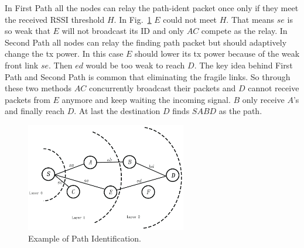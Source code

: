 \documentclass[conference]{IEEEtran}
\begin{document}
In First Path all the nodes can relay the path-ident packet once only if they meet the received RSSI threshold $H$. In Fig.~\ref{fig:ExpPathIdent} $E$ could not meet $H$. That means $se$ is so weak that $E$ will not broadcast its ID and only $AC$ compete as the relay. In Second Path all nodes can relay the finding path packet but should adaptively change the tx power. In this case $E$ should lower its tx power because of the weak front link $se$. Then $ed$ would be too weak to reach $D$. The key idea behind First Path and Second Path is common that eliminating the fragile links. So through these two methods $AC$ concurrently broadcast their packets and $D$ cannot receive packets from $E$ anymore and keep waiting the incoming signal. $B$ only receive $A$'s and finally reach $D$. At last the destination $D$ finds $SABD$ as the path.

\begin{figure}
\centering
\includegraphics[width=7cm]{ExpPathIdent.jpg}
\caption{Example of Path Identification.}
\label{fig:ExpPathIdent}
\end{figure}

\end{document}
